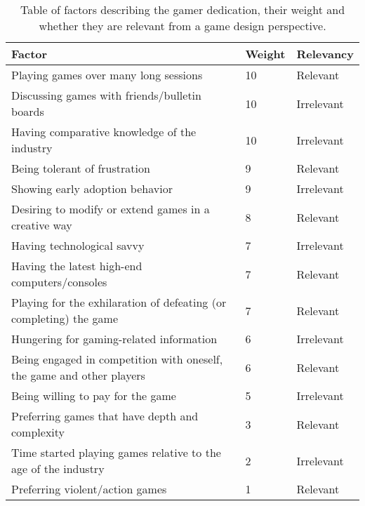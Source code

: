 \begin{table}[H]
\centering
\begin{tabular}{|l|l|l|}
\hline
\rowcolor[HTML]{C0C0C0} 
Factor                                                                & Weight 	& Relevancy \\ \hline
Playing games over many long sessions                                 & 10     	& Relevant 	\\ \hline
Discussing games with friends/bulletin boards                         & 10     	& Irrelevant\\ \hline
Having comparative knowledge of the industry                          & 10      & Irrelevant\\ \hline
Being tolerant of frustration                                         & 9       & Relevant 	\\ \hline
Showing early adoption behavior                                       & 9       & Irrelevant\\ \hline
Desiring to modify or extend games in a creative way                  & 8       & Relevant  \\ \hline
Having technological savvy                                            & 7       & Irrelevant\\ \hline
Having the latest high-end computers/consoles                         & 7       & Relevant  \\ \hline
Playing for the exhilaration of defeating (or completing) the game    & 7       & Relevant  \\ \hline
Hungering for gaming-related information                              & 6       & Irrelevant\\ \hline
Being engaged in competition with oneself, the game and other players & 6       & Relevant  \\ \hline
Being willing to pay for the game                                     & 5       & Irrelevant\\ \hline
Preferring games that have depth and complexity                       & 3       & Relevant  \\ \hline
Time started playing games relative to the age of the industry        & 2       & Irrelevant\\ \hline
Preferring violent/action games                                       & 1       & Relevant  \\ \hline
\end{tabular}
\caption{Table of factors describing the gamer dedication, their weight and whether they are relevant from a game design perspective.}
\label{tab:gamerdedication}
\end{table}

